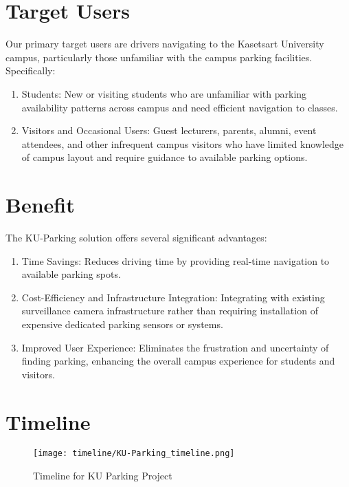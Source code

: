 \section{Target Users}
\label{section:target-user}

Our primary target users are drivers navigating to the Kasetsart University campus, particularly those unfamiliar with the campus parking facilities. Specifically:
\begin{enumerate}[leftmargin=80pt]
\item Students: New or visiting students who are unfamiliar with parking availability patterns across campus and need efficient navigation to classes.
\item Visitors and Occasional Users: Guest lecturers, parents, alumni, event attendees, and other infrequent campus visitors who have limited knowledge of campus layout and require guidance to available parking options.
\end{enumerate}


\section{Benefit}
\label{section:benefit}

The KU-Parking solution offers several significant advantages:

\begin{enumerate}[leftmargin=80pt]
    \item Time Savings: Reduces driving time by providing real-time navigation to available parking spots.
    
    \item Cost-Efficiency and Infrastructure Integration: Integrating with existing surveillance camera infrastructure rather than requiring installation of expensive dedicated parking sensors or systems.
    
    \item Improved User Experience: Eliminates the frustration and uncertainty of finding parking, enhancing the overall campus experience for students and visitors.
\end{enumerate}

\section{Timeline}
\label{section:timeline}

\begin{figure}[h!]
    \centering
    \texttt{[image: timeline/KU-Parking\_timeline.png]}
    \caption{Timeline for KU Parking Project}
    \label{fig:timeline}
\end{figure}

